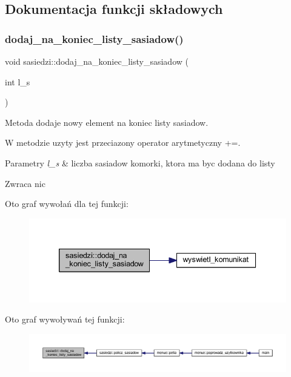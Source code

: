 \subsection{Dokumentacja funkcji składowych}
\mbox{\label{classsasiedzi_a7008b4aa9ff4ad86aafe65e6afc063b7}} 
\subsubsection{\texorpdfstring{dodaj\+\_\+na\+\_\+koniec\+\_\+listy\+\_\+sasiadow()}{dodaj\_na\_koniec\_listy\_sasiadow()}}
{\footnotesize\ttfamily void sasiedzi\+::dodaj\+\_\+na\+\_\+koniec\+\_\+listy\+\_\+sasiadow (\begin{DoxyParamCaption}\item[{int}]{l\+\_\+s }\end{DoxyParamCaption})}

Metoda dodaje nowy element na koniec listy sasiadow.

W metodzie uzyty jest przeciazony operator arytmetyczny +=. 
\begin{DoxyParams}{Parametry}
{\em l\+\_\+s} & liczba sasiadow komorki, ktora ma byc dodana do listy \\
\hline
\end{DoxyParams}
\begin{DoxyReturn}{Zwraca}
nic 
\end{DoxyReturn}
Oto graf wywołań dla tej funkcji\+:
\nopagebreak
\begin{figure}[H]
\begin{center}
\leavevmode
\includegraphics[width=339pt]{classsasiedzi_a7008b4aa9ff4ad86aafe65e6afc063b7_cgraph}
\end{center}
\end{figure}
Oto graf wywoływań tej funkcji\+:
\nopagebreak
\begin{figure}[H]
\begin{center}
\leavevmode
\includegraphics[width=350pt]{classsasiedzi_a7008b4aa9ff4ad86aafe65e6afc063b7_icgraph}
\end{center}
\end{figure}
\mbox{\label{classsasiedzi_a17ed824bb9a4791c2c4f3e88719b0005}} 
